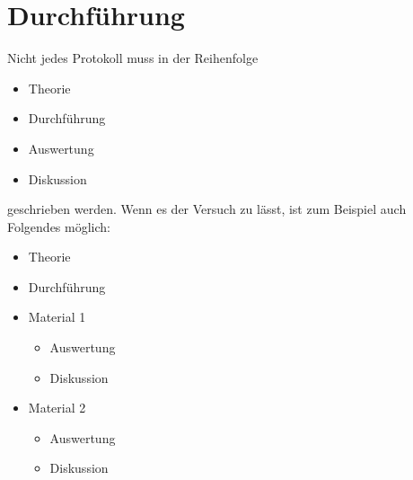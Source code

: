 \section{Durchführung}
\label{sec:Durchführung}



Nicht jedes Protokoll muss in der Reihenfolge
\begin{itemize}
  \item Theorie
  \item Durchführung
  \item Auswertung
  \item Diskussion
\end{itemize}
geschrieben werden.
Wenn es der Versuch zu lässt, ist zum Beispiel auch Folgendes möglich:
\begin{itemize}
  \item Theorie
  \item Durchführung
  \item Material 1
  \begin{itemize}
    \item Auswertung
    \item Diskussion
  \end{itemize}
  \item Material 2
  \begin{itemize}
    \item Auswertung
    \item Diskussion
  \end{itemize}
\end{itemize}
